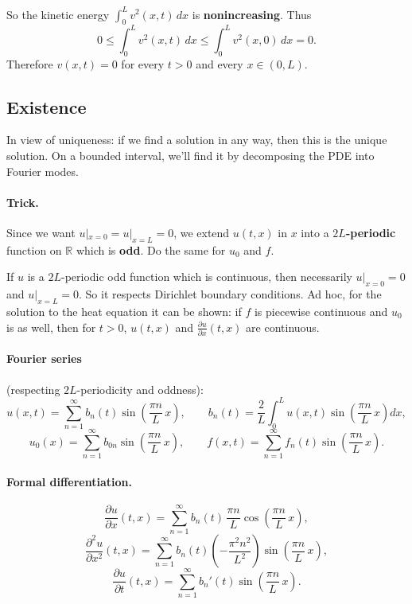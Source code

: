 So the kinetic energy $\int_0^L v^2(x, t)\,dx$ is \textbf{nonincreasing}. Thus
\[
0 \leq \int_0^L v^2(x, t)\,dx \leq \int_0^L v^2(x, 0)\,dx = 0.
\]
Therefore $v(x, t) = 0$ for every $t > 0$ and every $x \in (0, L)$.

\subsection{Existence}

In view of uniqueness: if we find a solution in any way, then this is the unique solution. On a bounded interval, we'll find it by decomposing the PDE into Fourier modes.

\paragraph{Trick.}
Since we want $u|_{x=0} = u|_{x=L} = 0$, we extend $u(t, x)$ in $x$ into a \textbf{$2L$-periodic} function on $\mathbb{R}$ which is \textbf{odd}. Do the same for $u_0$ and $f$.

\begin{remark}
If $u$ is a $2L$-periodic odd function which is continuous, then necessarily $u|_{x=0} = 0$ and $u|_{x=L} = 0$. So it respects Dirichlet boundary conditions. Ad hoc, for the solution to the heat equation it can be shown: if $f$ is piecewise continuous and $u_0$ is as well, then for $t > 0$, $u(t, x)$ and $\frac{\partial u}{\partial x}(t, x)$ are continuous.
\end{remark}

\paragraph{Fourier series} (respecting $2L$-periodicity and oddness):
\[
u(x, t) = \sum_{n=1}^{\infty} b_n(t)\sin\!\left(\frac{\pi n}{L}\,x\right), \qquad
b_n(t) = \frac{2}{L}\int_0^L u(x, t)\sin\!\left(\frac{\pi n}{L}\,x\right) dx,
\]
\[
u_0(x) = \sum_{n=1}^{\infty} b_{0n}\sin\!\left(\frac{\pi n}{L}\,x\right), \qquad
f(x, t) = \sum_{n=1}^{\infty} f_n(t)\sin\!\left(\frac{\pi n}{L}\,x\right).
\]

\paragraph{Formal differentiation.}
\[
\frac{\partial u}{\partial x}(t, x) = \sum_{n=1}^{\infty} b_n(t)\,\frac{\pi n}{L}\cos\!\left(\frac{\pi n}{L}\,x\right),
\]
\[
\frac{\partial^2 u}{\partial x^2}(t, x) = \sum_{n=1}^{\infty} b_n(t)\left(-\frac{\pi^2 n^2}{L^2}\right)\sin\!\left(\frac{\pi n}{L}\,x\right),
\]
\[
\frac{\partial u}{\partial t}(t, x) = \sum_{n=1}^{\infty} b_n'(t)\sin\!\left(\frac{\pi n}{L}\,x\right).
\]

